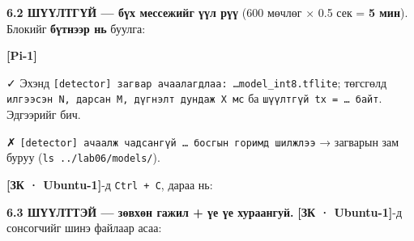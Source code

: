 \textbf{6.2 ШҮҮЛТГҮЙ --- бүх мессежийг үүл рүү} (600 мөчлөг × 0.5 сек = \textbf{5 мин}). Блокийг \textbf{бүтнээр нь} буулга:

\textbf{{[}Pi-1{]}}

\begin{Shaded}
\begin{Highlighting}[]
\VariableTok{)}
 \KeywordTok{\textbackslash{}}
\VariableTok{)}
 \VariableTok{$((}\VariableTok{))} \KeywordTok{|} 
\end{Highlighting}
\end{Shaded}

✓ Эхэнд \texttt{{[}detector{]}\ загвар\ ачаалагдлаа:\allowbreak{}\ \ldots{}model\_\allowbreak{}int8.\allowbreak{}tflite}; төгсгөлд \texttt{илгээсэн\ N,\ дарсан\ M,\ дүгнэлт\ дундаж\ X\ мс} ба \texttt{шүүлтгүй\ tx\ =\allowbreak{}\ \ldots{}\ байт}. Эдгээрийг бич.

✗ \texttt{{[}detector{]}\ ачаалж\ чадсангүй\ \ldots{}\ босгын\ горимд\ шилжлээ} → загварын зам буруу (\texttt{ls\ .\allowbreak{}.\allowbreak{}/\allowbreak{}lab06/\allowbreak{}models/\allowbreak{}}).

\textbf{{[}ЗК · Ubuntu-1{]}}-д \texttt{Ctrl\ +\ C}, дараа нь:

\begin{Shaded}
\begin{Highlighting}[]
\KeywordTok{\&\&} 
\end{Highlighting}
\end{Shaded}

\textbf{6.3 ШҮҮЛТТЭЙ --- зөвхөн гажил + үе үе хураангуй.} \textbf{{[}ЗК · Ubuntu-1{]}}-д сонсогчийг шинэ файлаар асаа:

\begin{Shaded}
\begin{Highlighting}[]
\KeywordTok{|} 
\end{Highlighting}
\end{Shaded}

